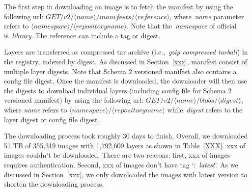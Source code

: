 The first step in downloading an image is to fetch the manifest by using the
following url: $GET /v2/\langle name \rangle/manifests/\langle reference \rangle$,
where~\textit{name} parameter refers to
$\langle namespace\rangle/\langle repository name \rangle$.
%
Note that the~\textit{namespace} of official is~\textit{library}.
%
The reference can include a tag or digest.
%
%



%
Layers are transferred as compressed tar archive
(i.e.,~\textit{gzip compressed tarball}) in the registry, indexed by digest.
%
%
As discussed in Section~\ref{xxx}, manifest consist of multiple layer digests.
%
Note that Schema 2 versioned manifest also contains a config file digest.
%
Once the manifest is downloaded, the downloader will then use the digests to
download individual layers (including config file for Schema 2 versioned manifest)
by using the following url: $GET /v2/\langle name \rangle/blobs/\langle digest \rangle$,
where \textit{name} refers to $\langle namespace\rangle/\langle repository name \rangle$
while~\textit{digest} refers to the layer digest or config file digest.

%
%


The downloading process took roughly 30 days to finish.
%
Overall, we downloaded 51 TB of 355,319 images with 1,792,609 layers as shown
in Table~\ref{XXX}.
%
xxx of images couldn't be downloaded.
%
There are two reasons: first, xxx of images requires authentication.
%
Second, xxx of images don't have tag `:~\textit{latest}'.
%
As we discussed in Section~\ref{xxx}, we only downloaded the images with latest 
version to shorten the downloading process.





